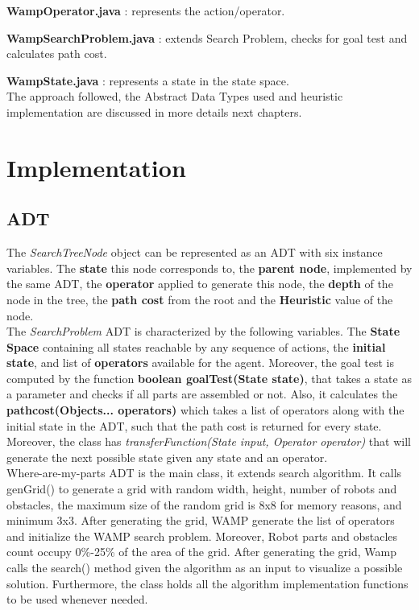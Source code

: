\textbf{WampOperator.java} : represents the action/operator.

\textbf{WampSearchProblem.java} : extends Search Problem, checks for goal test and calculates path cost.

\textbf{WampState.java} : represents a state in the state space.\\

The approach followed, the Abstract Data Types used and heuristic implementation are discussed in more details next chapters.

\chapter{Implementation}


\section{ADT}
The \textit{SearchTreeNode} object can be represented as an ADT with six instance variables. The \textbf{state} this node corresponds to, the \textbf{parent node}, implemented by the same ADT, the \textbf{operator} applied to generate this node, the \textbf{depth} of the node in the tree, the \textbf{path cost} from the root and the \textbf{Heuristic} value of the node.\\

The \textit{SearchProblem} ADT is characterized by the following variables. The \textbf{State Space} containing all states reachable by any sequence of actions, the \textbf{initial state}, and list of \textbf{operators} available for the agent. Moreover, the goal test is computed by the function \textbf{boolean goalTest(State state)}, that takes a state as a parameter and checks if all parts are assembled or not. Also, it calculates the \textbf{pathcost(Objects... operators)} which takes a list of operators along with the initial state in the ADT, such that the path cost is returned for every state. Moreover, the class has \textit{transferFunction(State input, Operator operator)} that will generate the next possible state given any state and an operator.\\

Where-are-my-parts ADT is the main class, it extends search algorithm. It calls genGrid() to generate a grid with random width, height, number of robots and obstacles, the maximum size of the random grid is 8x8 for memory reasons, and minimum 3x3. After generating the grid, WAMP generate the list of operators and initialize the WAMP search problem. Moreover, Robot parts and obstacles count occupy 0\%-25\% of the area of the grid. After generating the grid, Wamp calls the search() method given the algorithm as an input to visualize a possible solution. Furthermore, the class holds all the algorithm implementation functions to be used whenever needed.

